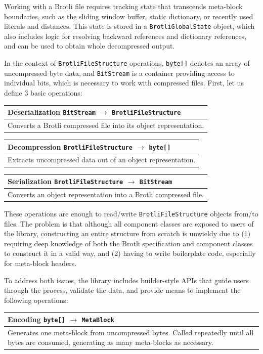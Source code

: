 \documentclass[english,master,dept460,male,cpp,cpdeclaration]{diploma}
\begin{document}
Working with a Brotli file requires tracking state that transcends meta-block boundaries, such as the sliding window buffer, static dictionary, or recently used literals and distances. This state is stored in a \verb|BrotliGlobalState| object, which also includes logic for resolving backward references and dictionary references, and can be used to obtain whole decompressed output.

In the context of \verb|BrotliFileStructure| operations, \verb|byte[]| denotes an array of uncompressed byte data, and \verb|BitStream| is a container providing access to individual bits, which is necessary to work with compressed files. First, let us define 3 basic operations:

\newcommand{\brotlioperationdesc}[4]{
	\bigskip
	\noindent
	\begin{tabularx}{\textwidth}{ X }
		\textbf{#1} \hfill #2 $\rightarrow$ #3 \\
		\hline
		#4 \\
	\end{tabularx}
	\smallskip
}

\medskip

\brotlioperationdesc
{Deserialization}
{\verb|BitStream|}
{\verb|BrotliFileStructure|}
{Converts a Brotli compressed file into its object representation.}

\brotlioperationdesc
{Decompression}
{\verb|BrotliFileStructure|}
{\verb|byte[]|}
{Extracts uncompressed data out of an object representation.}

\brotlioperationdesc
{Serialization}
{\verb|BrotliFileStructure|}
{\verb|BitStream|}
{Converts an object representation into a Brotli compressed file.}

\smallskip
\noindent
These operations are enough to read/write \verb|BrotliFileStructure| objects from/to files. The problem is that although all component classes are exposed to users of the library, constructing an entire structure from scratch is unwieldy due to (1) requiring deep knowledge of both the Brotli specification and component classes to construct it in a valid way, and (2) having to write boilerplate code, especially for meta-block headers.

To address both issues, the library includes builder-style APIs that guide users through the process, validate the data, and provide means to implement the following operations:

\medskip

\brotlioperationdesc
{Encoding}
{\verb|byte[]|}
{\verb|MetaBlock|}
{Generates one meta-block from uncompressed bytes. Called repeatedly until all bytes are consumed, generating as many meta-blocks as necessary.}
\end{document}
